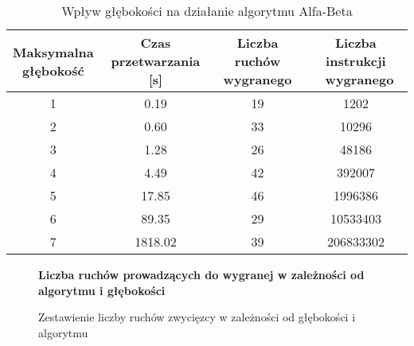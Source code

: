 \documentclass[a4paper,10pt]{article}
\begin{document}
    \begin{table}[H]
    \caption{Wpływ głębokości na działanie algorytmu Alfa-Beta}
    \label{minmax_depth}
    \begin{center}
    \begin{tabular}{|c|c|c|c|}
    \hline
    \thead{Maksymalna \\ głębokość} & \thead{Czas \\ przetwarzania [s]} & \thead{Liczba ruchów  \\ wygranego} & \thead{Liczba instrukcji \\\ wygranego} \\
    \hline
    {1} & \makecell{}0.19 & \makecell{}19 & \makecell{}1202 \\
    \hline
    {2} & \makecell{}0.60 & \makecell{}33 & \makecell{}10296 \\ 
    \hline
    {3} & \makecell{}1.28 & \makecell{}26 & \makecell{}48186 \\ 
    \hline
    {4} & \makecell{}4.49 & \makecell{}42 & \makecell{}392007 \\ 
    \hline
    {5} & \makecell{}17.85 & \makecell{}46 & \makecell{}1996386 \\ 
    \hline
    {6} & \makecell{}89.35 & \makecell{}29 & \makecell{}10533403 \\ 
    \hline
    {7} & \makecell{}1818.02 & \makecell{}39 & \makecell{}206833302
 \\ 
    \hline
    \end{tabular}
    \end{center}
     \end{table}
     
         \begin{figure}[H]
    \begin{center}
        \centering
        \large
        \textbf{Liczba ruchów prowadzących do wygranej w zależności od algorytmu i głębokości}\par\medskip
        \normalsize
        \caption{Zestawienie liczby ruchów zwycięzcy w zależności od głębokości i algorytmu}
    \end{center}
    \end{figure}
    
\end{document}

